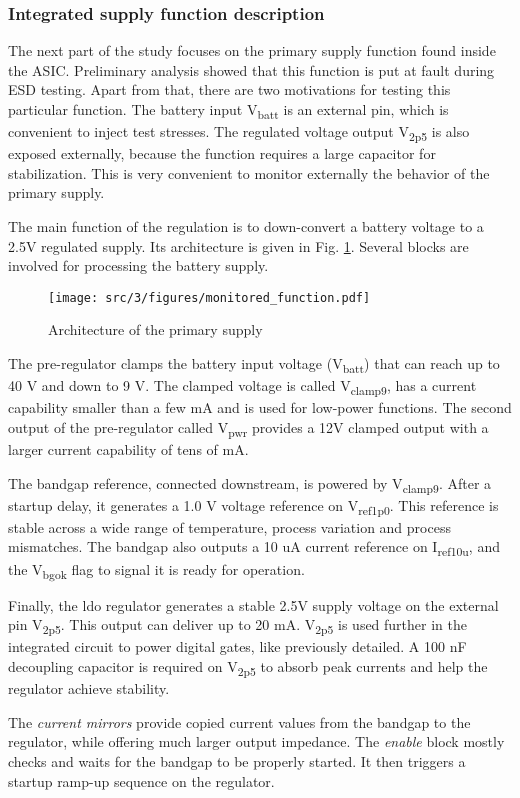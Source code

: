 \subsubsection{Integrated supply function description}
\label{sec:supply-desc}

The next part of the study focuses on the primary supply function found inside the ASIC.
Preliminary analysis showed that this function is put at fault during ESD testing.
Apart from that, there are two motivations for testing this particular function.
The battery input V\textsubscript{batt} is an external pin, which is convenient to inject test stresses.
The regulated voltage output V\textsubscript{2p5} is also exposed externally, because the function requires a large capacitor for stabilization.
This is very convenient to monitor externally the behavior of the primary supply.

The main function of the regulation is to down-convert a battery voltage to a 2.5V regulated supply.
Its architecture is given in Fig. \ref{fig:monitored_function}.
Several blocks are involved for processing the battery supply.

\begin{figure}[!h]
  \centering
  \texttt{[image: src/3/figures/monitored\_function.pdf]}
  \caption{Architecture of the primary supply}
  \label{fig:monitored_function}
\end{figure}

The pre-regulator clamps the battery input voltage (V\textsubscript{batt}) that can reach up to 40 V and down to 9 V.
The clamped voltage is called V\textsubscript{clamp9}, has a current capability smaller than a few mA and is used for low-power functions.
The second output of the pre-regulator called V\textsubscript{pwr} provides a 12V clamped output with a larger current capability of tens of mA.

The bandgap reference, connected downstream, is powered by V\textsubscript{clamp9}.
After a startup delay, it generates a 1.0 V voltage reference on V\textsubscript{ref1p0}.
This reference is stable across a wide range of temperature, process variation and process mismatches.
The bandgap also outputs a 10 uA current reference on I\textsubscript{ref10u}, and the V\textsubscript{bgok} flag to signal it is ready for operation.

Finally, the \gls{ldo} regulator generates a stable 2.5V supply voltage on the external pin V\textsubscript{2p5}.
This output can deliver up to 20 mA.
V\textsubscript{2p5} is used further in the integrated circuit to power digital gates, like previously detailed.
A 100 nF decoupling capacitor is required on V\textsubscript{2p5} to absorb peak currents and help the regulator achieve stability.

The \textit{current mirrors} provide copied current values from the bandgap to the regulator, while offering much larger output impedance.
The \textit{enable} block mostly checks and waits for the bandgap to be properly started.
It then triggers a startup ramp-up sequence on the regulator.
